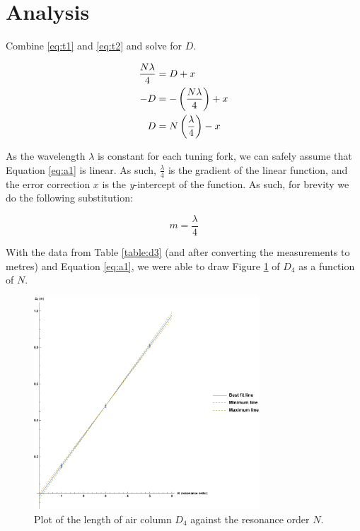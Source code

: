 \documentclass[letter]{article}
\numberwithin{equation}{section}
\numberwithin{figure}{section}
\numberwithin{table}{section}
\begin{document}
\section{Analysis}
Combine \eqref{eq:t1} and \eqref{eq:t2} and solve for \(D\).

\begin{align} \label{eq:a1}
  \frac{N \lambda}{4} &= D + x \notag \\
  -D &= - \left (\frac{N \lambda}{4} \right) + x \notag \\
  D &= N \left(\frac{\lambda}{4} \right) - x
\end{align}

\pagebreak[3]

As the wavelength \(\lambda\) is constant for each tuning fork, we can safely assume that Equation \ref{eq:a1} is linear. As such, \(\frac{\lambda}{4}\) is the gradient of the linear function, and the error correction \(x\) is the \textit{y}-intercept of the function. As such, for brevity we do the following substitution: \nopagebreak[4]

\begin{equation} \label{eq:a2}
  m = \frac{\lambda}{4}
\end{equation}

With the data from Table \ref{table:d3} (and after converting the measurements to metres) and Equation \ref{eq:a1}, we were able to draw Figure \ref{fig:plot1} of \(D_4\) as a function of \(N\).

\begin{figure}[!h]
  \centering
  \includegraphics[width=0.75\textwidth]{plot_pdf.png}
  \caption{Plot of the length of air column \(D_4\) against the resonance order \(N\).}
  \label{fig:plot1}
\end{figure}
\end{document}
